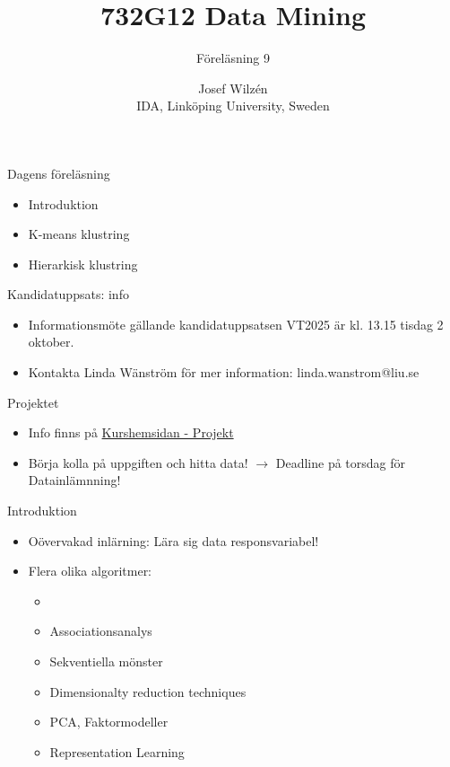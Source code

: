 \documentclass[10pt,english]{beamer}
\title{732G12 Data Mining}
\subtitle{Föreläsning 9}
\date{}
\author{Josef Wilzén \\ IDA, Linköping University, Sweden}
\begin{document}
\maketitle

\begin{frame}{Dagens föreläsning}

    \begin{itemize}
        \item Introduktion
        \item K-means klustring
        \item Hierarkisk klustring
    \end{itemize}
    
\end{frame}


\begin{frame}{Kandidatuppsats: info}

  \begin{itemize}
        \item  Informationsmöte gällande kandidatuppsatsen VT2025 är kl. 13.15 tisdag 2 oktober.
        \item Kontakta Linda Wänström för mer information: linda.wanstrom@liu.se
    \end{itemize}

\end{frame}


\begin{frame}{Projektet}
    \begin{itemize}
        \item Info finns på \href{https://www.ida.liu.se/~732G12/info/courseinfo.sv.shtml\#projekt}{Kurshemsidan - Projekt}
        \item Börja kolla på uppgiften och hitta data! $\rightarrow$ Deadline på torsdag för Datainlämnning!
    \end{itemize}
\end{frame}

\begin{frame}{Introduktion}
    \begin{itemize}
        \item Oövervakad inlärning: Lära sig data  responsvariabel!
        \item Flera olika algoritmer:
        \begin{itemize}
            \item {}
            \item Associationsanalys
            \item Sekventiella mönster
            \item Dimensionalty reduction techniques
            \item PCA, Faktormodeller
            \item Representation Learning
        \end{itemize}
    \end{itemize}
\end{frame}
\end{document}
